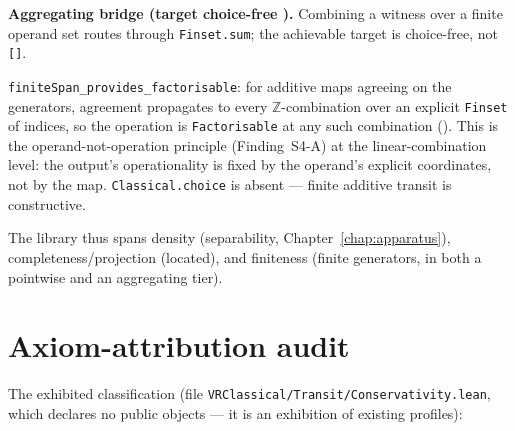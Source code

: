 \textbf{Aggregating bridge (target choice-free ).}
Combining a witness over a finite operand set routes through \texttt{Finset.sum};
the achievable target is choice-free, not \texttt{[]}.

\begin{theorem}
\label{thm:transit_finiteSpan}
\leanok
{}
\texttt{finiteSpan\_provides\_factorisable}: for additive maps agreeing on the
generators, agreement propagates to every $\mathbb{Z}$-combination over an explicit
\texttt{Finset} of indices, so the operation is \texttt{Factorisable} at any such
combination ().  This is the
operand-not-operation principle (Finding~S4-A) at the linear-combination level: the
output's operationality is fixed by the operand's explicit coordinates, not by the
map.  \texttt{Classical.choice} is absent --- finite additive transit is constructive.
\end{theorem}

The library thus spans density (separability, Chapter~\ref{chap:apparatus}),
completeness/projection (located), and finiteness (finite generators, in both a
pointwise and an aggregating tier).

\section{Axiom-attribution audit}
\label{sec:transit_audit}

The exhibited classification (file \texttt{VRClassical/Transit/Conservativity.lean},
which declares no public objects --- it is an exhibition of existing profiles):

